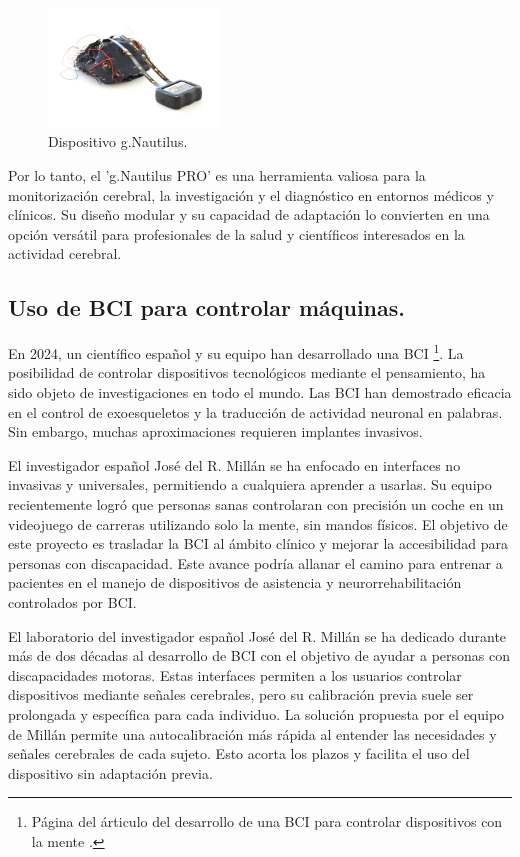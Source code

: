 \begin{figure}[H]
    \centering
    \includegraphics[width=0.4\textwidth]{img/g.Nautilus.pdf}
    \caption{Dispositivo g.Nautilus.}
    \label{fig: g.Nautilus}
\end{figure}

Por lo tanto, el 'g.Nautilus PRO' es una herramienta valiosa para la monitorización cerebral, la investigación y el diagnóstico en entornos médicos y clínicos. Su diseño modular y su capacidad de adaptación lo convierten en una opción versátil para profesionales de la salud y científicos interesados en la actividad cerebral.

\subsection{Uso de BCI para controlar máquinas.}
En 2024, un científico español y su equipo han desarrollado una BCI \cite{ArticuloControlBCI}\footnote{Página del árticulo del desarrollo de una BCI para controlar dispositivos con la mente \cite{ArticuloControlBCI}.}. La posibilidad de controlar dispositivos tecnológicos mediante el pensamiento, ha sido objeto de investigaciones en todo el mundo. Las BCI han demostrado eficacia en el control de exoesqueletos y la traducción de actividad neuronal en palabras. Sin embargo, muchas aproximaciones requieren implantes invasivos.

El investigador español José del R. Millán se ha enfocado en interfaces no invasivas y universales, permitiendo a cualquiera aprender a usarlas. Su equipo recientemente logró que personas sanas controlaran con precisión un coche en un videojuego de carreras utilizando solo la mente, sin mandos físicos. El objetivo de este proyecto es trasladar la BCI al ámbito clínico y mejorar la accesibilidad para personas con discapacidad. Este avance podría allanar el camino para entrenar a pacientes en el manejo de dispositivos de asistencia y neurorrehabilitación controlados por BCI.

El laboratorio del investigador español José del R. Millán se ha dedicado durante más de dos décadas al desarrollo de BCI con el objetivo de ayudar a personas con discapacidades motoras. Estas interfaces permiten a los usuarios controlar dispositivos mediante señales cerebrales, pero su calibración previa suele ser prolongada y específica para cada individuo. La solución propuesta por el equipo de Millán permite una autocalibración más rápida al entender las necesidades y señales cerebrales de cada sujeto. Esto acorta los plazos y facilita el uso del dispositivo sin adaptación previa.


